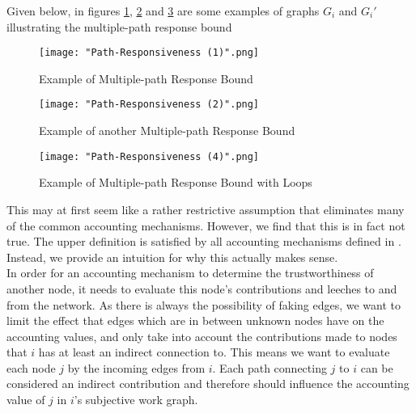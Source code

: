 \begin{definition}
\noindent{}Given below, in figures \ref{fig:Example of Multiple-path Response Bound (1)}, \ref{fig:Example of Multiple-path Response Bound (2)} and \ref{fig:Example of Multiple-path Response Bound (3)} are some examples of graphs $G_i$ and $G_i'$ illustrating the multiple-path response bound

\begin{figure}[H]
\begin{center}
\texttt{[image: "Path-Responsiveness (1)".png]}
\caption{Example of Multiple-path Response Bound}
\label{fig:Example of Multiple-path Response Bound (1)}
\end{center}
\end{figure}


\begin{figure}[H]
\begin{center}
\texttt{[image: "Path-Responsiveness (2)".png]}
\caption{Example of another Multiple-path Response Bound}
\label{fig:Example of Multiple-path Response Bound (2)}
\end{center}
\end{figure}


\begin{figure}[H]
\begin{center}
\texttt{[image: "Path-Responsiveness (4)".png]}
\caption{Example of Multiple-path Response Bound with Loops}
\label{fig:Example of Multiple-path Response Bound (3)}
\end{center}
\end{figure}
\end{definition}



\noindent{}This may at first seem like a rather restrictive assumption that eliminates many of the common accounting mechanisms. However, we find that this is in fact not true. The upper definition is satisfied by all accounting mechanisms defined in \cite{Hybrid Transitive Trust Mechanisms}. Instead, we provide an intuition for why this actually makes sense.\vspace{1em}\\

\noindent{}In order for an accounting mechanism to determine the trustworthiness of another node, it needs to evaluate this node's contributions and leeches to and from the network. As there is always the possibility of faking edges, we want to limit the effect that edges which are in between unknown nodes have on the accounting values, and only take into account the contributions made to nodes that $i$ has at least an indirect connection to. This means we want to evaluate each node $j$ by the incoming edges from $i$. Each path connecting $j$ to $i$ can be considered an indirect contribution and therefore should influence the accounting value of $j$ in $i$'s subjective work graph. \vspace{1em}\\

